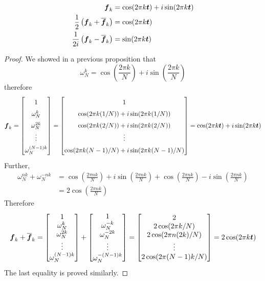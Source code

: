\begin{proposition}
\begin{align*}
\boldsymbol{f}_k & = \cos(2 \pi k \boldsymbol{t}) + i \sin(2 \pi k \boldsymbol{t}) \\
\frac{1}{2} \left( \boldsymbol{f}_k + \overline{\boldsymbol{f}}_k \right) &= \cos(2 \pi k \boldsymbol{t}) \\
\frac{1}{2i} \left( \boldsymbol{f}_k - \overline{\boldsymbol{f}}_k \right) &= \sin(2 \pi k \boldsymbol{t})
\end{align*}

\begin{proof}
We showed in a previous proposition that
$$
\omega_N^k = \cos\left( \frac{2 \pi k}{N} \right) + i \sin \left( \frac{2 \pi k}{N} \right)
$$
therefore
$$
\bs{f}_k =
\renewcommand{\arraystretch}{1.5}
\begin{bmatrix} 1 \\ \omega^k_N \\ \omega^{2k}_N \\ \vdots \\ \omega^{(N-1)k}_N \end{bmatrix}
=
\begin{bmatrix} 1 \\ \cos(2\pi k (1/N)) + i \sin(2\pi k (1/N)) \\ \cos(2\pi k (2/N)) + i \sin(2\pi k (2/N)) \\ \vdots \\ \cos(2\pi k (N-1)/N) + i \sin(2\pi k (N-1)/N) \end{bmatrix}
= \cos(2 \pi k \bs{t}) + i \sin(2 \pi k \bs{t})
$$
Further,
\begin{align*}
\omega_N^{nk} + \omega_N^{-nk} &= \cos\left( \frac{2 \pi n k}{N} \right) + i \sin \left( \frac{2 \pi n k}{N} \right) + \cos\left( \frac{2 \pi n k}{N} \right) - i \sin \left( \frac{2 \pi n k}{N} \right) \\
&= 2\cos\left( \frac{2 \pi n k}{N} \right) 
\end{align*}
Therefore
$$
\bs{f}_k + \overline{\bs{f}}_k =
\begin{bmatrix} 1 \\ \omega^k_N \\ \omega^{2k}_N \\ \vdots \\ \omega^{(N-1)k}_N \end{bmatrix} +
\begin{bmatrix} 1 \\ \omega^{-k}_N \\ \omega^{-2k}_N \\ \vdots \\ \omega^{-(N-1)k}_N \end{bmatrix}
= \begin{bmatrix} 2 \\ 2\cos( 2 \pi k/N ) \\ 2\cos( 2 \pi n (2k)/N ) \\ \vdots \\ 2\cos( 2 \pi (N-1) k/N ) \end{bmatrix}
= 2 \cos(2 \pi k \bs{t})
\renewcommand{\arraystretch}{1}
$$
The last equality is proved similarly.
\end{proof}
\end{proposition}

